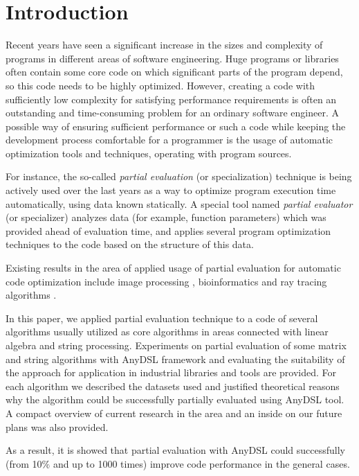 \documentclass[conference]{IEEEtran}
\begin{document}
\section{Introduction}
Recent years have seen a significant increase in the sizes and complexity of programs in different areas of software engineering. Huge programs or libraries often contain some core code on which significant parts of the program depend, so this code needs to be highly optimized. However, creating a code with sufficiently low complexity for satisfying performance requirements is often an outstanding and time-consuming problem for an ordinary software engineer. A possible way of ensuring sufficient performance or such a code while keeping the development process comfortable for a programmer is the usage of automatic optimization tools and techniques, operating with program sources.

For instance, the so-called \textit{partial evaluation} (or specialization) \cite{jones1993partial} technique is being actively used over the last years as a way to optimize program execution time automatically, using data known statically. A special tool named \textit{partial evaluator} (or specializer) analyzes data (for example, function parameters) which was provided ahead of evaluation time, and applies several program optimization techniques to the code based on the structure of this data. 


Existing results in the area of applied usage of partial evaluation for automatic code optimization include image processing \cite{leissa2018anydsl}, bioinformatics \cite{muller2020anyseq} and ray tracing algorithms \cite{perard2019rodent}.


In this paper, we applied partial evaluation technique to a code of several algorithms usually utilized as core algorithms in areas connected with linear algebra and string processing. Experiments on partial evaluation of some matrix and string algorithms with AnyDSL \cite{leissa2018anydsl} framework and evaluating the suitability of the approach for application in industrial libraries and tools are provided. For each algorithm we described the datasets used and justified theoretical reasons why the algorithm could be successfully partially evaluated using AnyDSL tool. A compact overview of current research in the area and an inside on our future plans was also provided.

As a result, it is showed that partial evaluation with AnyDSL could successfully (from 10$\%$ and up to 1000 times) improve code performance in the general cases.
\end{document}
